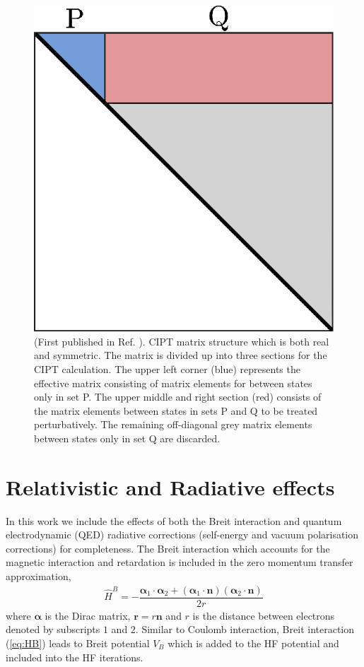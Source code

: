 \documentclass[10pt,a4paper, twoside]{report}
\begin{document}
\begin{figure}
\centering
\includegraphics[scale=1]{./figures/CIPT_matrix.eps}
\caption[CIPT matrix structure.]{(First published in Ref. \cite{Dzuba2017}). CIPT matrix structure which is both real and symmetric. The matrix is divided up into three sections for the CIPT calculation. The upper left corner (blue) represents the effective matrix consisting of matrix elements for between states only in set P. The upper middle and right section (red) consists of the matrix elements between states in sets P and Q to be treated perturbatively. The remaining off-diagonal grey matrix elements between states only in set Q are discarded. \label{fig:CIPT_matrix}}
\end{figure}
\section{Relativistic and Radiative effects}
In this work we include the effects of both the Breit interaction \cite{Breit1929, Mann1971} and quantum electrodynamic (QED) radiative corrections (self-energy and vacuum polarisation corrections) \cite{FG2005} for completeness. The Breit interaction which accounts for the magnetic interaction and retardation is included in the zero momentum transfer approximation,
\begin{align}\label{eq:HB}
\hat{H}^B = -\dfrac{\boldsymbol{\alpha}_1 \cdot \boldsymbol{\alpha}_2 + \left(\boldsymbol{\alpha}_1\cdot\textbf{n}\right)\left(\boldsymbol{\alpha}_2\cdot \textbf{n}\right)}{2r}
\end{align}
where $\boldsymbol{\alpha}$ is the Dirac matrix, $\textbf{r}=r\textbf{n}$ and $r$ is the distance between electrons 
denoted by subscripts $1$ and $2$.  Similar to Coulomb interaction, Breit interaction (\ref{eq:HB}) leads to Breit potential
$V_B$ which is added to the HF potential and included into the HF iterations.
\end{document}
